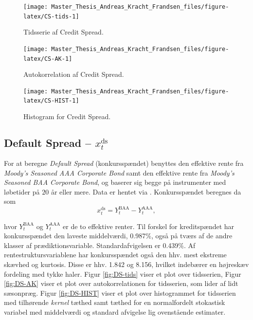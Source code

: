 \documentclass[
  a4paper,
  oneside]{memoir}
\begin{document}
\begin{figure}[H]

{\centering \texttt{[image: Master\_Thesis\_Andreas\_Kracht\_Frandsen\_files/figure-latex/CS-tids-1]} 

}

\caption{Tidsserie af Credit Spread.}\label{fig:CS-tids}
\end{figure}

\begin{figure}[H]

{\centering \texttt{[image: Master\_Thesis\_Andreas\_Kracht\_Frandsen\_files/figure-latex/CS-AK-1]} 

}

\caption{Autokorrelation af Credit Spread.}\label{fig:CS-AK}
\end{figure}

\begin{figure}[H]

{\centering \texttt{[image: Master\_Thesis\_Andreas\_Kracht\_Frandsen\_files/figure-latex/CS-HIST-1]} 

}

\caption{Histogram for Credit Spread.}\label{fig:CS-HIST}
\end{figure}

\hypertarget{default-spread-x_ttextds}{%
\subsection{\texorpdfstring{Default Spread -- \(x_t^{\text{ds}}\)}{Default Spread -- x\_t\^{}\{\textbackslash text\{ds\}\}}}\label{default-spread-x_ttextds}}

For at beregne \emph{Default Spread} (konkursspændet) benyttes den effektive rente fra \emph{Moody's Seasoned AAA Corporate Bond} samt den effektive rente fra \emph{Moody's Seasoned BAA Corporate Bond}, og baserer sig begge på instrumenter med løbetider på \(20\) år eller mere. Data er hentet via \citep{Goyal2007}. Konkursspændet beregnes da som
\[x_t^{\text{ds}}=Y_t^{\text{BAA}}-Y_t^{\text{AAA}},\]

hvor \(Y_t^{\text{BAA}}\) og \(Y_t^{\text{AAA}}\) er de to effektive renter. Til forskel for kreditspændet har konkursspændet den laveste middelværdi, 0.987\(\%\), også på tværs af de andre klasser af prædiktionsvariable. Standardafvigelsen er 0.439\(\%\). Af rentestruktursvariablene har konkursspændet også den hhv. mest ekstreme skævhed og kurtosis. Disse er hhv. 1.842 og 8.156, hvilket indebærer en højreskæv fordeling med tykke haler. Figur \ref{fig:DS-tids} viser et plot over tidsserien, Figur \ref{fig:DS-AK} viser et plot over autokorrelationen for tidsserien, som lider af lidt sæsonpræg. Figur \ref{fig:DS-HIST} viser et plot over histogrammet for tidsserien med tilhørende \emph{kernel} tæthed samt tæthed for en normalfordelt stokastisk variabel med middelværdi og standard afvigelse lig ovenstående estimater.
\end{document}
